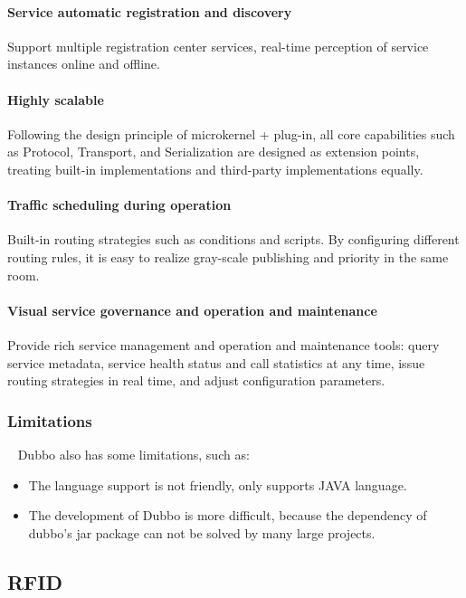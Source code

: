 \documentclass[conference]{IEEEtran}
\begin{document}
\paragraph{Service automatic registration and discovery}
Support multiple registration center services, real-time perception of service instances online and offline.

\paragraph{Highly scalable}
Following the design principle of microkernel + plug-in, all core capabilities such as Protocol, Transport, and Serialization are designed as extension points, treating built-in implementations and third-party implementations equally.

\paragraph{Traffic scheduling during operation}
Built-in routing strategies such as conditions and scripts. By configuring different routing rules, it is easy to realize gray-scale publishing and priority in the same room.

\paragraph{Visual service governance and operation and maintenance}
Provide rich service management and operation and maintenance tools: query service metadata, service health status and call statistics at any time, issue routing strategies in real time, and adjust configuration parameters.


\subsubsection{Limitations}
\
\newline
\indent
Dubbo also has some limitations, such as:

\begin{itemize}
\item The language support is not friendly, only supports JAVA language.

\item The development of Dubbo is more difficult, because the dependency of dubbo's jar package can not be solved by many large projects.
\end{itemize}


\subsection{RFID}
\end{document}
